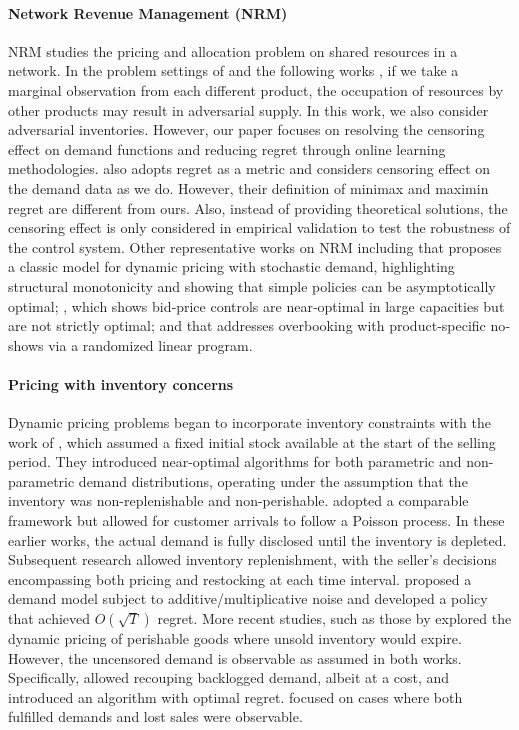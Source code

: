 \paragraph{Network Revenue Management (NRM)} NRM \citep{talluri2006theory} studies the pricing and allocation problem on shared resources in a network. In the problem settings of \citet{besbes2012blind} and the following works \citet{simchi2019blind, miao2024demand}, if we take a marginal observation from each different product, the occupation of resources by other products may result in adversarial supply. In this work, we also consider adversarial inventories. However, our paper focuses on resolving the censoring effect on demand functions and reducing regret through online learning methodologies. \citet{perakis2010robust} also adopts regret as a metric and considers censoring effect on the demand data as we do. However, their definition of minimax and maximin regret are different from ours. Also, instead of providing theoretical solutions, the censoring effect is only considered in empirical validation to test the robustness of the control system. Other representative works on NRM including \citet{gallego1994optimal} that proposes a classic model for dynamic pricing with stochastic demand, highlighting structural monotonicity and showing that simple policies can be asymptotically optimal; \citet{talluri1998analysis}, which shows bid‐price controls are near‐optimal in large capacities but are not strictly optimal; and \citet{meissner2012network} that addresses overbooking with product‐specific no‐shows via a randomized linear program.

\paragraph{Pricing with inventory concerns}
Dynamic pricing problems began to incorporate inventory constraints with the work of \citet{besbes2009dynamic}, which assumed a fixed initial stock available at the start of the selling period. They introduced near-optimal algorithms for both parametric and non-parametric demand distributions, operating under the assumption that the inventory was non-replenishable and non-perishable. \citet{wang2014close} adopted a comparable framework but allowed for customer arrivals to follow a Poisson process. In these earlier works, the actual demand is fully disclosed until the inventory is depleted. Subsequent research allowed inventory replenishment, with the seller's decisions encompassing both pricing and restocking at each time interval. \citet{chen2019coordinating} proposed a demand model subject to additive/multiplicative noise and developed a policy that achieved $O(\sqrt{T})$ regret. More recent studies, such as those by \citet{chen2020data, keskin2022data, xu2025joint} explored the dynamic pricing of perishable goods where unsold inventory would expire. However, the uncensored demand is observable as assumed in both works. Specifically, \citet{chen2020data} allowed recouping backlogged demand, albeit at a cost, and introduced an algorithm with optimal regret. \citet{keskin2022data} focused on cases where both fulfilled demands and lost sales were observable.

